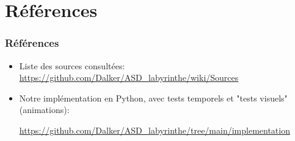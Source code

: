 \documentclass[]{beamer}
\begin{document}
\section{Références}
\begin{frame}
  \frametitle{Références}
  \begin{itemize}
  \item Liste des sources consultées:
    \url{https://github.com/Dalker/ASD_labyrinthe/wiki/Sources}
  \item Notre implémentation en Python, avec tests temporels et "tests
    visuels" (animations):
    
    \url{https://github.com/Dalker/ASD_labyrinthe/tree/main/implementation}
  \end{itemize}
\end{frame}
\end{document}
